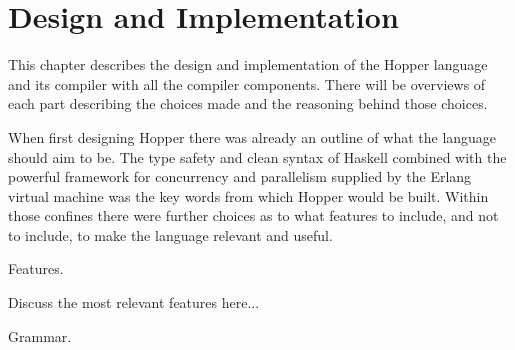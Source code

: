 \chapter{Design and Implementation}


This chapter describes the design and implementation of the Hopper language and its compiler with all the compiler components. There will be overviews of each part describing the choices made and the reasoning behind those choices.



When first designing Hopper there was already an outline of what the language should aim to be. The type safety and clean syntax of Haskell combined with the powerful framework for concurrency and parallelism supplied by the Erlang virtual machine was the key words from which Hopper would be built. Within those confines there were further choices as to what features to include, and not to include, to make the language relevant and useful.

Features.

Discuss the most relevant features here...

Grammar.



%






